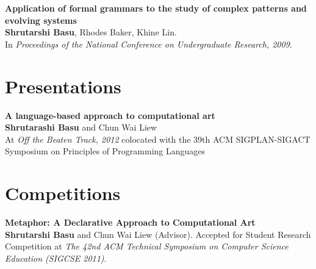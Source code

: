 \documentclass[margin,line]{resume}
\begin{document}
\begin{resume}
    {\bf Application of formal grammars to the study of complex patterns
      and evolving systems}\\
    {\bf Shrutarshi Basu}, Rhodes Baker, Khine Lin. \\
    In \emph{Proceedings of the National Conference on Undergraduate Research,
      2009}.

    \section{Presentations}
    {\bf A language-based approach to computational art}\\
    {\bf Shrutarashi Basu} and Chun Wai Liew\\
    At \emph{Off the Beaten Track, 2012} colocated with the 39th ACM
    SIGPLAN-SIGACT Symposium on Principles of Programming Languages


    \section{Competitions}
    {\bf Metaphor: A Declarative Approach to Computational Art} \\
    {\bf Shrutarshi Basu} and Chun Wai Liew (Advisor). 
    Accepted for Student Research Competition at \emph{The 42nd ACM Technical
      Symposium on Computer Science Education (SIGCSE 2011)}.

\end{resume}
\end{document}
